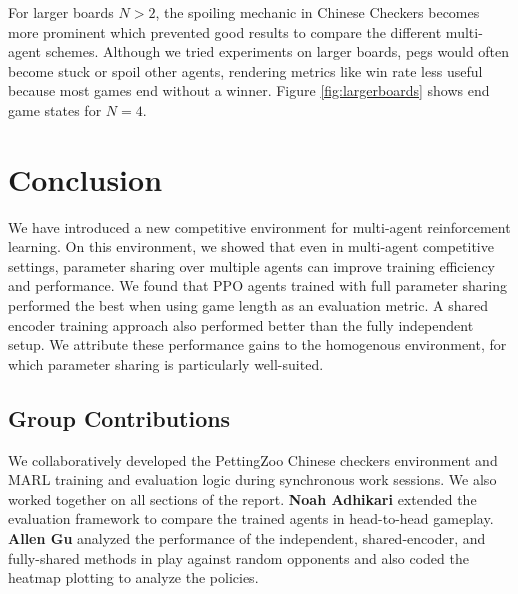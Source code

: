 \documentclass[12pt, a4paper, twocolumn]{article}
\begin{document}
For larger boards $N > 2$, the spoiling mechanic in Chinese Checkers becomes more prominent which prevented good results to compare the different multi-agent schemes. Although we tried experiments on larger boards, pegs would often become stuck or spoil other agents, rendering metrics like win rate less useful because most games end without a winner. Figure \ref{fig:largerboards} shows end game states for $N = 4$.

\section{Conclusion}

We have introduced a new competitive environment for multi-agent reinforcement learning. On this environment, we showed that even in multi-agent competitive settings, parameter sharing over multiple agents can improve training efficiency and performance. We found that PPO agents trained with full parameter sharing performed the best when using game length as an evaluation metric. A shared encoder training approach also performed better than the fully independent setup. We attribute these performance gains to the homogenous environment, for which parameter sharing is particularly well-suited.

\subsection{Group Contributions}

We collaboratively developed the PettingZoo Chinese checkers environment and MARL training and evaluation logic during synchronous work sessions. We also worked together on all sections of the report. \textbf{Noah Adhikari} extended the evaluation framework to compare the trained agents in head-to-head gameplay. \textbf{Allen Gu} analyzed the performance of the independent, shared-encoder, and fully-shared methods in play against random opponents and also coded the heatmap plotting to analyze the policies.


\nocite{*}


\end{document}
